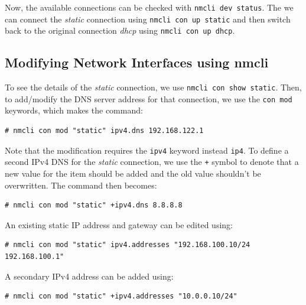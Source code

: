 \noindent
Now, the available connections can be checked with \verb|nmcli dev status|. The we can connect the \textit{static} connection using \verb|nmcli con up static| and then switch back to the original connection \textit{dhcp} using \verb|nmcli con up dhcp|.

\subsection{Modifying Network Interfaces using nmcli}

To see the details of the \textit{static} connection, we use \verb|nmcli con show static|. Then, to add/modify the DNS server address for that connection, we use the \verb|con mod| keywords, which makes the command:

\vspace{-15pt}
\begin{verbatim}
# nmcli con mod "static" ipv4.dns 192.168.122.1
\end{verbatim}
\vspace{-10pt}	

\noindent
Note that the modification requires the \verb|ipv4| keyword instead \verb|ip4|. To define a second IPv4 DNS for the \textit{static} connection, we use the \verb|+| symbol to denote that a new value for the item should be added and the old value shouldn't be overwritten. The command then becomes: 

\vspace{-15pt}
\begin{verbatim}
# nmcli con mod "static" +ipv4.dns 8.8.8.8
\end{verbatim}
\vspace{-10pt}	

\noindent
An existing static IP address and gateway can be edited using:

\vspace{-15pt}
\begin{verbatim}
# nmcli con mod "static" ipv4.addresses "192.168.100.10/24 192.168.100.1"
\end{verbatim}
\vspace{-10pt}	

\noindent
A secondary IPv4 address can be added using:

\vspace{-15pt}
\begin{verbatim}
# nmcli con mod "static" +ipv4.addresses "10.0.0.10/24"
\end{verbatim}
\vspace{-10pt}	

